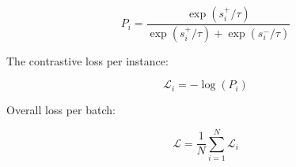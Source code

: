 \[
P_i = \frac{\exp(s^+_i / \tau)}{\exp(s^+_i / \tau) + \exp(s^-_i / \tau)}
\]

The contrastive loss per instance:

\[
\mathcal{L}_i = -\log(P_i)
\]

Overall loss per batch:

\[
\mathcal{L} = \frac{1}{N} \sum_{i=1}^{N} \mathcal{L}_i
\]











